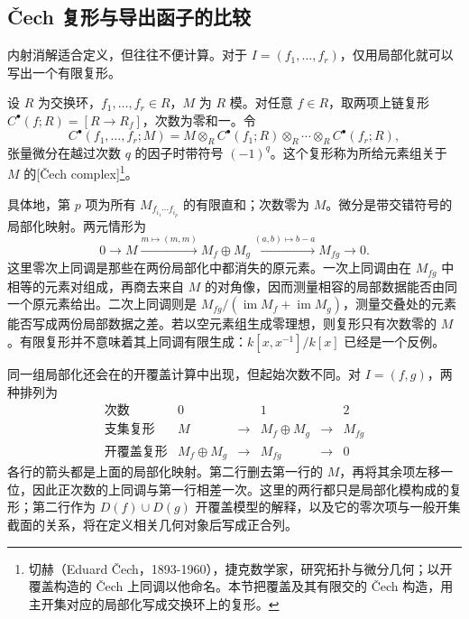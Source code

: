 \subsection{Čech 复形与导出函子的比较}
\label{b3:subsec:2201:02}

内射消解适合定义，但往往不便计算。对于 \(I=(f_1,\ldots,f_r)\)，仅用局部化就可以写出一个有限复形。

\begin{definition}\label{b3:def:cech-complex}
	设 \(R\) 为交换环，\(f_1,\ldots,f_r\in R\)，\(M\) 为 \(R\) 模。对任意 \(f\in R\)，取两项上链复形 \(C^\bullet(f;R)=[R\to R_f]\)，次数为零和一。令
	\[
		C^\bullet(f_1,\ldots,f_r;M) =M\otimes_R C^\bullet(f_1;R)\otimes_R\cdots\otimes_R C^\bullet(f_r;R),
	\]
	张量微分在越过次数 \(q\) 的因子时带符号 \((-1)^q\)。这个复形称为所给元素组关于 \(M\) 的[Čech complex]\footnote{切赫（Eduard Čech，1893-1960），捷克数学家，研究拓扑与微分几何；以开覆盖构造的 Čech 上同调以他命名。本节把覆盖及其有限交的 Čech 构造，用主开集对应的局部化写成交换环上的复形。}。
\end{definition}

具体地，第 \(p\) 项为所有 \(M_{f_{i_1}\cdots f_{i_p}}\) 的有限直和；次数零为 \(M\)。微分是带交错符号的局部化映射。两元情形为
\[
	0\longrightarrow M\xrightarrow{m\mapsto(m,m)}M_f\oplus M_g \xrightarrow{(a,b)\mapsto b-a}M_{fg}\longrightarrow0.
\]
这里零次上同调是那些在两份局部化中都消失的原元素。一次上同调由在 \(M_{fg}\) 中相等的元素对组成，再商去来自 \(M\) 的对角像，因而测量相容的局部数据能否由同一个原元素给出。二次上同调则是 \(M_{fg}/(\operatorname{im}M_f+\operatorname{im}M_g)\)，测量交叠处的元素能否写成两份局部数据之差。若以空元素组生成零理想，则复形只有次数零的 \(M\)。有限复形并不意味着其上同调有限生成：\(k[x,x^{-1}]/k[x]\) 已经是一个反例。

\ProseParagraphBreak
同一组局部化还会在的开覆盖计算中出现，但起始次数不同。对 \(I=(f,g)\)，两种排列为
\[
	\begin{array}{c|ccccc}
		\text{次数}&0&&1&&2\\\hline \text{支集复形}&M&\longrightarrow&M_f\oplus M_g&\longrightarrow&M_{fg}\\
		\text{开覆盖复形}&M_f\oplus M_g&\longrightarrow&M_{fg}&\longrightarrow&0
	\end{array}
\]
各行的箭头都是上面的局部化映射。第二行删去第一行的 \(M\)，再将其余项左移一位，因此正次数的上同调与第一行相差一次。这里的两行都只是局部化模构成的复形；第二行作为 \(D(f)\cup D(g)\) 开覆盖模型的解释，以及它的零次项与一般开集截面的关系，将在定义相关几何对象后写成正合列。

